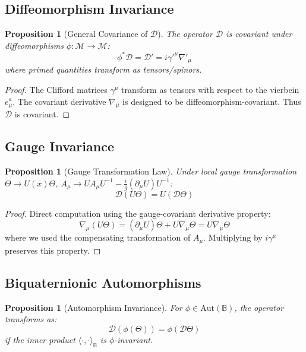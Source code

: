 \documentclass[12pt]{article}
\newtheorem{proposition}[definition]{Proposition}
\newcommand{\B}{\mathbb{B}}
\newcommand{\M}{\mathcal{M}}
\begin{document}
\subsection{Diffeomorphism Invariance}

\begin{proposition}[General Covariance of $\mathcal{D}$]
The operator $\mathcal{D}$ is covariant under diffeomorphisms $\phi: \M \to \M$:
\begin{equation}
\phi^* \mathcal{D} = \mathcal{D}' = i \gamma'^\mu \nabla'_\mu
\end{equation}
where primed quantities transform as tensors/spinors.
\end{proposition}

\begin{proof}
The Clifford matrices $\gamma^\mu$ transform as tensors with respect to the vierbein $e_\mu^a$. The covariant derivative $\nabla_\mu$ is designed to be diffeomorphism-covariant. Thus $\mathcal{D}$ is covariant.
\end{proof}

\subsection{Gauge Invariance}

\begin{proposition}[Gauge Transformation Law]
Under local gauge transformation $\Theta \to U(x) \Theta$, $A_\mu \to U A_\mu U^{-1} - \frac{i}{g}(\partial_\mu U) U^{-1}$:
\begin{equation}
\mathcal{D}(U \Theta) = U (\mathcal{D} \Theta)
\end{equation}
\end{proposition}

\begin{proof}
Direct computation using the gauge-covariant derivative property:
\[
\nabla_\mu (U \Theta) = (\partial_\mu U) \Theta + U \nabla_\mu \Theta = U \nabla_\mu \Theta
\]
where we used the compensating transformation of $A_\mu$. Multiplying by $i\gamma^\mu$ preserves this property.
\end{proof}

\subsection{Biquaternionic Automorphisms}

\begin{proposition}[Automorphism Invariance]
For $\phi \in \mathrm{Aut}(\B)$, the operator transforms as:
\begin{equation}
\mathcal{D}(\phi(\Theta)) = \phi(\mathcal{D} \Theta)
\end{equation}
if the inner product $\langle \cdot, \cdot \rangle_\B$ is $\phi$-invariant.
\end{proposition}
\end{document}
